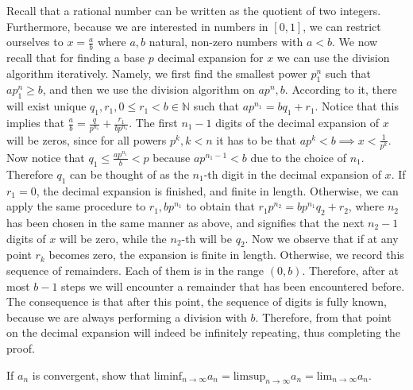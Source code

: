 \begin{solution}
    Recall that a rational number can be written as the quotient of two integers. Furthermore, because we are interested in numbers in $[0, 1]$, we can restrict ourselves to $x = \frac{a}{b}$ where $a, b$ natural, non-zero numbers with $a < b$. We now recall that for finding a base $p$ decimal expansion for $x$ we can use the division algorithm iteratively. Namely, we first find the smallest power $p^n_1$ such that $ap^n_1 \geq b$, and then we use the division algorithm on $ap^n, b$. According to it, there will exist unique $q_1, r_1, 0 \leq r_1 < b \in \mathbb{N}$ such that $ap^{n_1} = bq_1 + r_1$. Notice that this implies that $\frac{a}{b} = \frac{q}{p^{n_1}} + \frac{r_1}{bp^{n_1}}$. The first $n_1-1$ digits of the decimal expansion of $x$ will be zeros, since for all powers $p^k, k<n$ it has to be that $ap^k < b \implies x < \frac{1}{p^k}$. Now notice that $q_1 \leq \frac{ap^{n_1}}{b} < p$ because $ap^{n_1-1} < b$ due to the choice of $n_1$. Therefore $q_1$ can be thought of as the $n_1$-th digit in the decimal expansion of $x$. If $r_1 = 0$, the decimal expansion is finished, and finite in length. Otherwise, we can apply the same procedure to $r_1, bp^{n_1}$ to obtain that $r_1p^{n_2} = bp^{n_1}q_2 + r_2$, where $n_2$ has been chosen in the same manner as above, and signifies that the next $n_2 - 1$ digits of $x$ will be zero, while the $n_2$-th will be $q_2$. Now we observe that if at any point $r_k$ becomes zero, the expansion is finite in length. Otherwise, we record this sequence of remainders. Each of them is in the range $(0, b)$. Therefore, after at most $b - 1$ steps we will encounter a remainder that has been encountered before. The consequence is that after this point, the sequence of digits is fully known, because we are always performing a division with $b$. Therefore, from that point on the decimal expansion will indeed be infinitely repeating, thus completing the proof.
    
\end{solution}

\begin{exercise}{23}
    If $a_n$ is convergent, show that $\text{liminf}_{n\rightarrow \infty} a_n = \text{limsup}_{n \rightarrow \infty} a_n = \text{lim}_{n \rightarrow \infty} a_n$.
\end{exercise}

